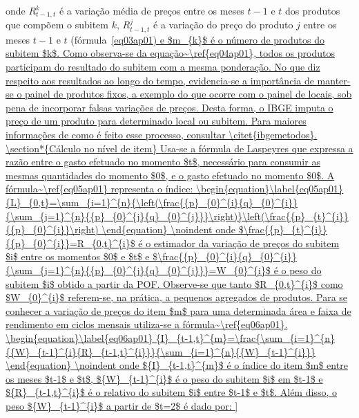 \documentclass[twoside,a4paper,11pt]{report}
\begin{document}
\noindent onde ${R}_{t-1,t}^{k}$ é a variação média de preços entre os meses $t-1$ e $t$ dos produtos que compõem o subitem $k$, ${R}_{t-1,t}^{j}$ é a variação do preço do produto $j$ entre os meses $t-1$ e $t$ (fórmula~\ref{eq03ap01) e $m_{k}$ é o número de produtos do subitem $k$. Como observa-se da equação~\ref{eq04ap01}, todos os produtos participam do resultado do subitem com a mesma ponderação.

No que diz respeito aos resultados ao longo do tempo, evidencia-se a importância de manter-se o painel de produtos fixos, a exemplo do que ocorre com o painel de locais, sob pena de incorporar falsas variações de preços. Desta forma, o IBGE imputa o preço de um produto para determinado local ou subitem. Para maiores informações de como é feito esse processo, consultar \citet{ibgemetodos}.

\section*{Cálculo no nível de item}

Usa-se a fórmula de Laspeyres que expressa a razão entre o gasto efetuado no momento $t$, necessário para consumir as mesmas quantidades do momento $0$, e o gasto efetuado no momento $0$. A fórmula~\ref{eq05ap01} representa o índice:

\begin{equation}\label{eq05ap01}
{L}_{0,t}=\sum_{i=1}^{n}{\left(\frac{{p}_{0}^{i}{q}_{0}^{i}}{\sum_{j=1}^{n}{{p}_{0}^{j}{q}_{0}^{j}}}\right)}\left(\frac{{p}_{t}^{i}}{{p}_{0}^{i}}\right) 
\end{equation}

\noindent onde $\frac{{p}_{t}^{i}}{{p}_{0}^{i}}=R_{0,t}^{i}$ é o estimador da variação de preços do subitem $i$ entre os momentos $0$ e $t$ e $\frac{{p}_{0}^{i}{q}_{0}^{i}}{\sum_{j=1}^{n}{{p}_{0}^{j}{q}_{0}^{j}}}=W_{0}^{i}$ é o peso do subitem $i$ obtido a partir da POF. Observe-se que tanto $R_{0,t}^{i}$ como $W_{0}^{i}$ referem-se, na prática, a pequenos agregados de produtos. Para se conhecer a variação de preços do item $m$ para uma determinada área e faixa de rendimento em ciclos mensais utiliza-se a fórmula~\ref{eq06ap01}.

\begin{equation}\label{eq06ap01}
{I}_{t-1,t}^{m}=\frac{\sum_{i=1}^{n}{{W}_{t-1}^{i}{R}_{t-1,t}^{i}}}{\sum_{i=1}^{n}{{W}_{t-1}^{i}}} 
\end{equation}

\noindent onde ${I}_{t-1,t}^{m}$ é o índice do item $m$ entre os meses $t-1$ e $t$, ${W}_{t-1}^{i}$ é o peso do subitem $i$ em $t-1$ e ${R}_{t-1,t}^{i}$ é o relativo do subitem $i$ entre $t-1$ e $t$. Além disso, o peso ${W}_{t-1}^{i}$ a partir de $t=2$ é dado por:

}
\end{document}
